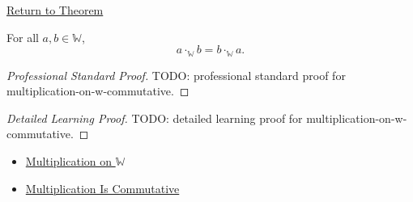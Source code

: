 \newpage
{}
\label{prf:multiplication-on-w-commutative}

\begin{remark*}[Return]
\hyperref[thm:multiplication-on-w-commutative]{Return to Theorem}
\end{remark*}

\begin{theorem*}
For all $a,b\in\mathbb{W}$,
\[
a\cdot_{\mathbb{W}}b=b\cdot_{\mathbb{W}}a.
\]
\end{theorem*}

\begin{proof}[Professional Standard Proof]
\LRAProofBodyStart
TODO: professional standard proof for multiplication-on-w-commutative.
\end{proof}

\begin{proof}[Detailed Learning Proof]
\LRAProofBodyStart
TODO: detailed learning proof for multiplication-on-w-commutative.
\end{proof}

\begin{remark*}
\end{remark*}

\begin{dependencies}
\begin{itemize}
  \item \hyperref[def:multiplication-on-w]{Multiplication on $\mathbb{W}$}
  \item \hyperref[thm:multiplication-commutative]{Multiplication Is Commutative}
\end{itemize}
\end{dependencies}

\clearpage
